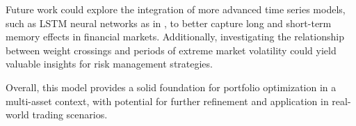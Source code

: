 \documentclass[a4paper,11pt]{article}
\begin{document}
Future work could explore the integration of more advanced time series models, such as LSTM neural networks as in \cite{nakagawa}, to better capture long and short-term memory effects in financial markets. Additionally, investigating the relationship between weight crossings and periods of extreme market volatility could yield valuable insights for risk management strategies.

Overall, this model provides a solid foundation for portfolio optimization in a multi-asset context, with potential for further refinement and application in real-world trading scenarios.


\clearpage
{}
\listoffigures
\clearpage
\printbibliography
\end{document}
